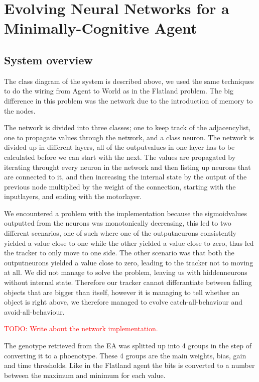 \section{Evolving Neural Networks for a Minimally-Cognitive Agent}
\subsection{System overview}
The class diagram of the system is described above, we used the same techniques to do the wiring from Agent to World as in the Flatland problem. The big difference in this problem was the network due to the introduction of memory to the nodes.

The network is divided into three classes; one to keep track of the adjacencylist, one to propagate values through the network, and a class neuron. The network is divided up in different layers, all of the outputvalues in one layer has to be calculated before we can start with the next.
The values are propagated by iterating throught every neuron in the network and then listing up neurons that are connected to it, and then increasing the internal state by the output of the previous node multiplied by the weight of the connection, starting with the inputlayers, and ending with the motorlayer. 


 We encountered a problem with the implementation because the sigmoidvalues outputted from the neurons was monotonically decreasing, this led to two different scenarios, one of such where one of the outputneurons consistently yielded a value close to one while the other yielded a value close to zero, thus led the tracker to only move to one side. The other scenario was that both the outputneurons yielded a value close to zero, leading to the tracker not to moving at all. We did not manage to solve the problem, leaving us with hiddenneurons without internal state. Therefore our tracker cannot differantiate between falling objects that are bigger than itself, however it is managing to tell whether an object is right above, we therefore managed to evolve catch-all-behaviour and avoid-all-behaviour. 


\textcolor{red}{TODO: Write about the network implementation.}


The genotype retrieved from the EA was splitted up into 4 groups in the step of converting it to a phoenotype. These 4 groups are the main weights, bias, gain and time thresholds. Like in the Flatland agent the bits is converted to a number between the maximum and minimum for each value.

